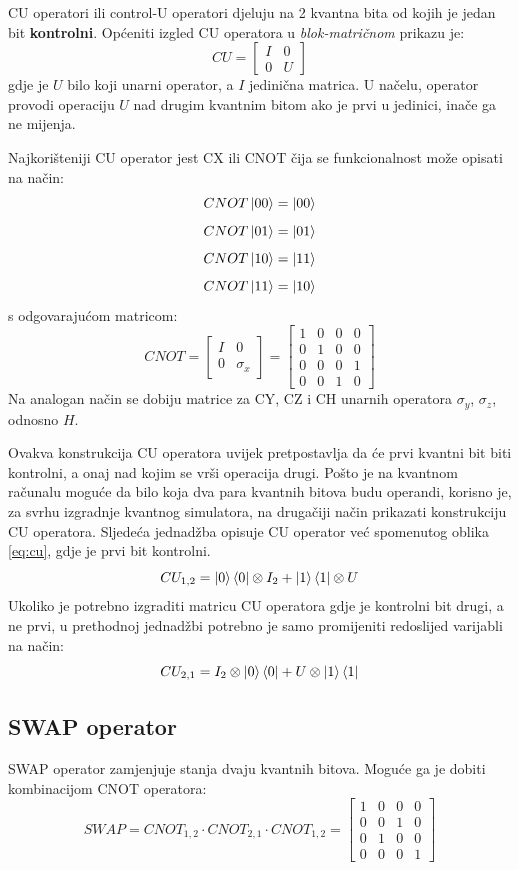 CU operatori ili control-U operatori djeluju na 2 kvantna bita od kojih je jedan bit \textbf{kontrolni}. Općeniti izgled CU operatora u \emph{blok-matričnom} prikazu je:
\begin{equation}
CU = \begin{bmatrix}
I & 0 \\ 0 & U
\end{bmatrix}
\label{eq:cu}
\end{equation}
gdje je $U$ bilo koji unarni operator, a $I$ jedinična matrica. U načelu, operator provodi operaciju $U$ nad drugim kvantnim bitom ako je prvi u jedinici, inače ga ne mijenja.

Najkorišteniji CU operator jest CX ili CNOT čija se funkcionalnost može opisati na način:
\[CNOT\ket{00} = \ket{00}\]
\[CNOT\ket{01} = \ket{01}\]
\[CNOT\ket{10} = \ket{11}\]
\[CNOT\ket{11} = \ket{10}\]
s odgovarajućom matricom:
\[
CNOT = \begin{bmatrix}
I & 0 \\ 0 & \sigma_x
\end{bmatrix} =
\begin{bmatrix}
1 & 0 & 0 & 0 \\ 0 & 1 & 0 & 0 \\ 0 & 0 & 0 & 1 \\ 0 & 0 & 1 & 0
\end{bmatrix}
\]
Na analogan način se dobiju matrice za CY, CZ i CH unarnih operatora $\sigma_y$, $\sigma_z$, odnosno $H$.

Ovakva konstrukcija CU operatora uvijek pretpostavlja da će prvi kvantni bit biti kontrolni, a onaj nad kojim se vrši operacija drugi. Pošto je na kvantnom računalu moguće da bilo koja dva para kvantnih bitova budu operandi, korisno je, za svrhu izgradnje kvantnog simulatora, na drugačiji način prikazati konstrukciju CU operatora. Sljedeća jednadžba opisuje CU operator već spomenutog oblika \ref{eq:cu}, gdje je prvi bit kontrolni.
\[
CU_{1,2} = \ket{0}\bra{0} \otimes I_2 + \ket{1}\bra{1} \otimes U
\]
Ukoliko je potrebno izgraditi matricu CU operatora gdje je kontrolni bit drugi, a ne prvi, u prethodnoj jednadžbi potrebno je samo promijeniti redoslijed varijabli na način:
\[
CU_{2,1} = I_2  \otimes \ket{0}\bra{0} + U \otimes \ket{1}\bra{1}
\]

\subsection{SWAP operator}

SWAP operator zamjenjuje stanja dvaju kvantnih bitova. Moguće ga je dobiti kombinacijom CNOT operatora:
\[
\textit{SWAP} = CNOT_{1,2}\cdot CNOT_{2,1}\cdot CNOT_{1,2} = \begin{bmatrix}
1 & 0 & 0 & 0 \\ 0 & 0 & 1 & 0 \\ 0 & 1 & 0 & 0 \\ 0 & 0 & 0 & 1
\end{bmatrix}
\]

